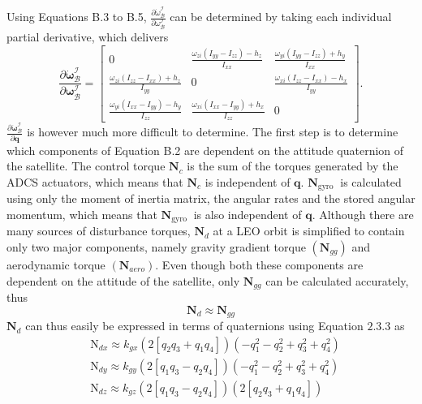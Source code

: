 Using Equations B.3 to B.5, $\frac{\partial \dot{\omega}_{\mathcal{B}}^{\mathcal{I}}}{\partial \omega_{\mathcal{B}}^{\mathcal{I}}}$ can be determined by taking each individual partial derivative, which delivers
$$
\frac{\partial \dot{\boldsymbol{\omega}}_{\mathcal{B}}^{\mathcal{I}}}{\partial \boldsymbol{\omega}_{\mathcal{B}}^{\mathcal{I}}}=\left[\begin{array}{ccc}
0 & \frac{\omega_{z i}\left(I_{y y}-I_{z z}\right)-h_{z}}{I_{x x}} & \frac{\omega_{y i}\left(I_{y y}-I_{z z}\right)+h_{y}}{I_{x x}} \\
\frac{\omega_{z i}\left(I_{z z}-I_{x x}\right)+h_{z}}{I_{y y}} & 0 & \frac{\omega_{x i}\left(I_{z z}-I_{x x}\right)-h_{x}}{I_{y y}} \\
\frac{\omega_{y i}\left(I_{x x}-I_{y y}\right)-h_{y}}{I_{z z}} & \frac{\omega_{x i}\left(I_{x x}-I_{y y}\right)+h_{x}}{I_{z z}} & 0
\end{array}\right] .
$$
$\frac{\partial \dot{\boldsymbol{\omega}}_{\mathcal{B}}^{\mathcal{I}}}{\partial \mathbf{q}}$ is however much more difficult to determine. The first step is to determine which components of Equation B.2 are dependent on the attitude quaternion of the satellite. The control torque $\mathbf{N}_{c}$ is the sum of the torques generated by the ADCS actuators, which means that $\mathbf{N}_{c}$ is independent of $\mathbf{q}$. $\mathbf{N}_{\text {gyro }}$ is calculated using only the moment of inertia matrix, the angular rates and the stored angular momentum, which means that $\mathbf{N}_{\text {gyro }}$ is also independent of $\mathbf{q}$. Although there are many sources of disturbance torques, $\mathbf{N}_{d}$ at a LEO orbit is simplified to contain only two major components, namely gravity gradient torque $\left(\mathbf{N}_{g g}\right)$ and aerodynamic torque $\left(\mathbf{N}_{a e r o}\right)$. Even though both these components are dependent on the attitude of the satellite, only $\mathbf{N}_{g g}$ can be calculated accurately, thus
$$
\mathbf{N}_{d} \approx \mathbf{N}_{g g}
$$
$\mathbf{N}_{d}$ can thus easily be expressed in terms of quaternions using Equation $2.3 .3$ as
$$
\begin{aligned}
&\mathrm{N}_{d x} \approx k_{g x}\left(2\left[q_{2} q_{3}+q_{1} q_{4}\right]\right)\left(-q_{1}^{2}-q_{2}^{2}+q_{3}^{2}+q_{4}^{2}\right) \\
&\mathrm{N}_{d y} \approx k_{g y}\left(2\left[q_{1} q_{3}-q_{2} q_{4}\right]\right)\left(-q_{1}^{2}-q_{2}^{2}+q_{3}^{2}+q_{4}^{2}\right) \\
&\mathrm{N}_{d z} \approx k_{g z}\left(2\left[q_{1} q_{3}-q_{2} q_{4}\right]\right)\left(2\left[q_{2} q_{3}+q_{1} q_{4}\right]\right)
\end{aligned}
$$
